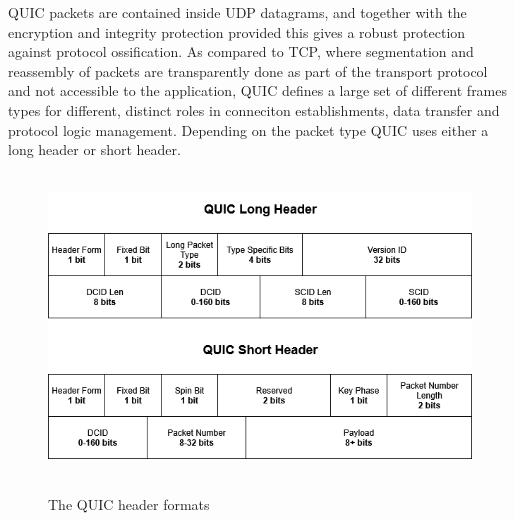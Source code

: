 \documentclass[english, 12pt, a4paper, elec, utf8, a-2b, online]{aaltothesis}
\begin{document}
QUIC packets are contained inside UDP datagrams, and together with the encryption
and integrity protection provided this gives a robust protection against protocol
ossification. As compared to TCP, where segmentation and reassembly of packets are
transparently done as part of the transport protocol and not accessible to the
application, QUIC defines a large set of different frames types for different,
distinct roles in conneciton establishments, data transfer and protocol logic
management. Depending on the packet type QUIC uses either a long header or short
header.
\begin{figure}[b]
	\centering
	\includegraphics[alt={A block diagram of the QUIC short and long header format, detailing its fields and their sizes.}, height=8cm]{./images/quic_header.png}
	\caption{The QUIC header formats}
	\label{fig:quic_header}
\end{figure}
\end{document}
